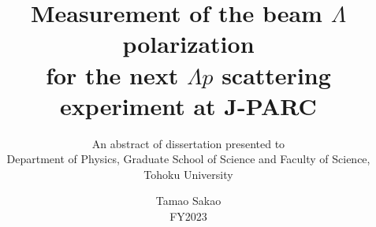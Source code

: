 \documentclass[a4paper,11pt,twoside,twocolumn]{article}
\begin{document}
\newcommand{\XM}{\Xi^{-}}
\newcommand{\Xz}{\Xi^{0}}

\newcommand{\pM}{\pi^{-}}
\newcommand{\pP}{\pi^{+}}
\newcommand{\pZ}{\pi^{0}}
\newcommand{\pPM}{\pi^{\pm}}
\newcommand{\KP}{K^{+}}
\newcommand{\KM}{K^{-}}
\newcommand{\Kz}{K^{0}}
\newcommand{\Lp}{\Lambda p}
\newcommand{\LpLX}{\Lambda p \to \Lambda X}

\newcommand{\LN}{\Lambda N}
\newcommand{\SN}{\Sigma N}
\newcommand{\LNtoSN}{\Lambda N\to\Sigma N}
\newcommand{\LS}{\Lambda - \Sigma}


\newcommand{\dcs}{d\sigma/d\Omega}
\newcommand{\fdcs}{\frac{d\sigma}{d\Omega}}
\newcommand{\dz}{\Delta z}
\newcommand{\dzkz}{\Delta z_{K^{0}}}


\newcommand{\bgct}{\beta\gamma c\tau}

\newcommand{\costp}{\cos{\theta_p}}
\newcommand{\costkz}{\cos{\theta_{K0,CM}}}
\newcommand{\costcm}{\cos{\theta}_{CM}}
\newcommand{\PL}{P_{\Lambda}}
\newcommand{\PLall}{P_{\Lambda,\ all}}
\newcommand{\PLsele}{P_{\Lambda,\ selected}}
\newcommand{\errPL}{\sigma(P_{\Lambda})}

\newcommand{\rud}{r_{ud}}
\newcommand{\errrud}{\sigma(\rud)}

\newcommand{\accPL}{\epsilon_{\PL}}
\newcommand{\erraccPL}{\sigma(\epsilon_{\PL})}

\newcommand{\PLscat}{P_{\Lambda'}}
\newcommand{\effPLw}{\epsilon_{\PL,\ w/}}
\newcommand{\erreffPLw}{\sigma(\epsilon_{\PL,\ w/})}
\newcommand{\effPLwo}{\epsilon_{\PL,\ w/o}}
\newcommand{\erreffPLwo}{\sigma(\epsilon_{\PL,\ w/o})}

\newcommand{\chisq}{\chi^{2}}
\newcommand*{\rom}[1]{\expandafter\@slowromancap\romannumeral #1@}
\makeatother

\vspace{-20pt}
\title{%
Measurement of the beam $\Lambda$ polarization \\for the next $\Lp$ scattering experiment at J-PARC}
\author{An abstract of dissertation presented to\\
Department of Physics, Graduate School of Science and Faculty of Science, Tohoku University\\
}
\date{Tamao Sakao\\FY2023}
\maketitle
\end{document}
